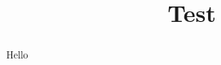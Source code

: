 \documentclass{xourse}
\title{Test}
\begin{document}
\begin{abstract}
  Hello
\end{abstract}
\maketitle


\end{document}
